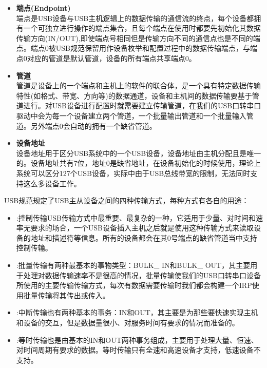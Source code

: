 \begin{enumerate}
\begin{itemize}
	\item \textbf{端点(Endpoint)}\\
	端点是USB设备与USB主机逻辑上的数据传输的通信流的终点，每个设备都拥有一个可独立进行操作的端点集合，且每个端点在使用时都要先初始化其数据传输方向(IN/OUT),即使端点号相同但是传输方向不同的通信点也是不同的端点。端点0被USB规范保留用作设备枚举和配置过程中的数据传输端点，与端点0对应的管道是默认管道，设备的所有端点共享端点0\cite{李雪红2004USB}。
	
	\item \textbf{管道}\\
	管道是设备上的一个端点和主机上的软件的联合体，是一个具有特定数据传输特性(如格式、带宽、方向等)的数据通道，设备和主机间的数据传输要基于管道进行。对USB设备进行配置时就需要建立传输管道，在我们的USB口转串口驱动中会为每一个设备建立两个管道，一个批量输出管道和一个批量输入管道。另外端点0会自动的拥有一个缺省管道。
	\item \textbf{设备地址}\\
	设备地址用于区分USB系统中的一个USB设备，设备地址由主机分配且是唯一的。设备地址共有7位，地址0是缺省地址，在设备初始化的时候使用，理论上系统可以区分127个USB设备，实际中由于USB总线带宽的限制，无法同时支持这么多设备工作\cite{李雪红2004USB}。
	\end{itemize}	
	
\end{enumerate}



\noindent USB规范规定了USB主从设备之间的四种传输方式，每种方式有各自的用途\cite{USB总线接口开发指南}：
\begin{itemize}
\item {}:控制传输USB传输方式中最重要、最复杂的一种，它适用于少量、对时间和速率无要求的场合，一个USB设备插入主机之后就是使用这种传输方式来读取设备的地址和描述符等信息。所有的设备都会在其0号端点的缺省管道当中支持控制传输\cite{张杰2008基于}。
\item {}:批量传输有两种最基本的事物类型：BULK\_ IN和BULK\_ OUT，其主要用于处理对数据传输速率不是很高的情况，批量传输使我们的USB口转串口设备所使用的主要传输传输方式，每次有数据需要传输时我们都会构建一个IRP使用批量传输将其传出或传入。
\item {}:中断传输也有两种基本的事务：IN和OUT，其主要是为那些要快速实现主机和设备的交互，但是数据量很小、对服务时间有要求的情况而准备的。
\item {}:等时传输也是由基本的IN和OUT两种事务组成，主要用于处理大量、恒速、对时间周期有要求的数据。等时传输只有全速和高速设备才支持，低速设备不支持\cite{张杰2008基于}。
\end{itemize}


